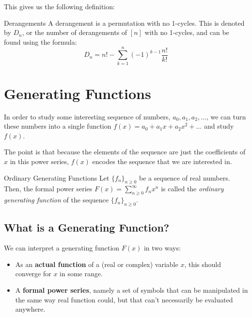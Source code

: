 \documentclass[letterpaper]{article}
\begin{document}
This gives us the following definition: 
\begin{definition}{Derangements}{}
    A derangement is a permutation with no 1-cycles. This is denoted by $D_n$, or the number of derangements of $[n]$ with no 1-cycles, and can be found using the formula:
    \[D_n = n! - \sum_{k = 1}^n (-1)^{k - 1} \frac{n!}{k!}\]
\end{definition}









\newpage 
\section{Generating Functions}
In order to study some interesting sequence of numbers, $a_0, a_1, a_2, \dots$, we can turn these numbers into a single function $f(x) = a_0 + a_{1}x + a_{2}x^2 + \dots$ and study $f(x)$. 

\bigskip 

The point is that because the elements of the sequence are just the coefficients of $x$ in this power series, $f(x)$ encodes the sequence that we are interested in.

\begin{definition}{Ordinary Generating Functions}{}
    Let $\{f_n\}_{n \geq 0}$ be a sequence of real numbers. Then, the formal power series $F(x) = \sum_{n \geq 0}^{\infty} f_n x^n$ is called the \emph{ordinary generating function} of the sequence $\{f_n\}_{n \geq 0}$. 
\end{definition}

\subsection{What is a Generating Function?}
We can interpret a generating function $F(x)$ in two ways: 
\begin{itemize}
    \item As an \textbf{actual function} of a (real or complex) variable $x$, this should converge for $x$ in some range. 
    \item A \textbf{formal power series}, namely a set of symbols that can be manipulated in the same way real function could, but that can't necessarily be evaluated anywhere. 
\end{itemize}
\end{document}
